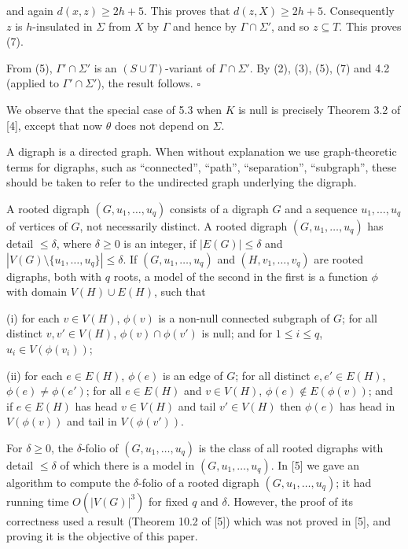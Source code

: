 \noindent and again $d(x, z) \ge 2h + 5$. This proves that $d(z, X) \ge 2h + 5$. Consequently $z$ is $h$-insulated in $\Sigma$ from $X$ by $\Gamma$ and hence by $\Gamma \cap \Sigma'$, and so $z \subseteq T$. This proves (7).

From (5), $\Gamma' \cap \Sigma'$ is an $(S \cup T)$-variant of $\Gamma \cap \Sigma'$. By (2), (3), (5), (7) and 4.2 (applied to $\Gamma' \cap \Sigma'$), the result follows. $\square$

We observe that the special case of 5.3 when $K$ is null is precisely Theorem 3.2 of [4], except that now $\theta$ does not depend on $\Sigma$.


A digraph is a directed graph. When without explanation we use graph-theoretic terms for digraphs, such as ``connected'', ``path'', ``separation'', ``subgraph'', these should be taken to refer to the undirected graph underlying the digraph.

A rooted digraph $(G, u_1, \ldots, u_q)$ consists of a digraph $G$ and a sequence $u_1, \ldots, u_q$ of vertices of $G$, not necessarily distinct. A rooted digraph $(G, u_1, \ldots, u_q)$ has detail $\le \delta$, where $\delta \ge 0$ is an integer, if $|E(G)| \le \delta$ and $|V(G) \setminus \{u_1, \ldots, u_q\}| \le \delta$. If $(G, u_1, \ldots, u_q)$ and $(H, v_1, \ldots, v_q)$ are rooted digraphs, both with $q$ roots, a model of the second in the first is a function $\phi$ with domain $V(H) \cup E(H)$, such that

\hspace*{12pt}(i) for each $v \in V(H)$, $\phi(v)$ is a non-null connected subgraph of $G$; for all distinct $v, v' \in V(H)$, $\phi(v) \cap \phi(v')$ is null; and for $1 \le i \le q$, $u_i \in V(\phi(v_i))$;

\hspace*{12pt}(ii) for each $e \in E(H)$, $\phi(e)$ is an edge of $G$; for all distinct $e, e' \in E(H)$, $\phi(e) \ne \phi(e')$; for all $e \in E(H)$ and $v \in V(H)$, $\phi(e) \notin E(\phi(v))$; and if $e \in E(H)$ has head $v \in V(H)$ and tail $v' \in V(H)$ then $\phi(e)$ has head in $V(\phi(v))$ and tail in $V(\phi(v'))$.

For $\delta \ge 0$, the $\delta$-folio of $(G, u_1, \ldots, u_q)$ is the class of all rooted digraphs with detail $\le \delta$ of which there is a model in $(G, u_1, \ldots, u_q)$. In [5] we gave an algorithm to compute the $\delta$-folio of a rooted digraph $(G, u_1, \ldots, u_q)$; it had running time $O(|V(G)|^3)$ for fixed $q$ and $\delta$. However, the proof of its correctness used a result (Theorem 10.2 of [5]) which was not proved in [5], and proving it is the objective of this paper.

